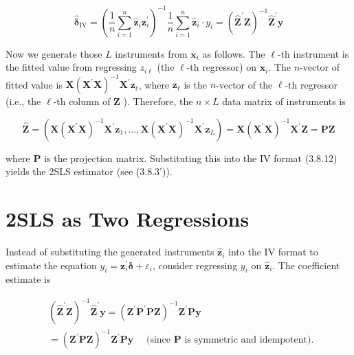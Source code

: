 \documentclass[10pt]{article}
\begin{document}
\begin{equation*}
\hat{\boldsymbol{\delta}}_{\mathrm{IV}}=\left(\frac{1}{n} \sum_{i=1}^{n} \hat{\mathbf{z}}_{i} \mathbf{z}_{i}^{\prime}\right)^{-1} \frac{1}{n} \sum_{i=1}^{n} \hat{\mathbf{z}}_{i} \cdot y_{i}=\left(\widehat{\mathbf{Z}}^{\prime} \mathbf{Z}\right)^{-1} \widehat{\mathbf{Z}}^{\prime} \mathbf{y} \tag{3.8.12}
\end{equation*}


Now we generate those $L$ instruments from $\mathbf{x}_{i}$ as follows. The $\ell$-th instrument is the fitted value from regressing $z_{i \ell}$ (the $\ell$-th regressor) on $\mathbf{x}_{i}$. The $n$-vector of fitted value is $\mathbf{X}\left(\mathbf{X}^{\prime} \mathbf{X}\right)^{-1} \mathbf{X}^{\prime} \mathbf{z}_{\ell}$, where $\mathbf{z}_{\ell}$ is the $n$-vector of the $\ell$-th regressor (i.e., the $\ell$-th column of $\mathbf{Z}$ ). Therefore, the $n \times L$ data matrix of instruments is


\begin{equation*}
\widehat{\mathbf{Z}}=\left(\mathbf{X}\left(\mathbf{X}^{\prime} \mathbf{X}\right)^{-1} \mathbf{X}^{\prime} \mathbf{z}_{1}, \ldots, \mathbf{X}\left(\mathbf{X}^{\prime} \mathbf{X}\right)^{-1} \mathbf{X}^{\prime} \mathbf{z}_{L}\right)=\mathbf{X}\left(\mathbf{X}^{\prime} \mathbf{X}\right)^{-1} \mathbf{X}^{\prime} \mathbf{Z}=\mathbf{P} \mathbf{Z} \tag{3.8.13}
\end{equation*}


where $\mathbf{P}$ is the projection matrix. Substituting this into the IV format (3.8.12) yields the 2SLS estimator (see (3.8.3')).

\section*{2SLS as Two Regressions}
Instead of substituting the generated instruments $\hat{\mathbf{z}}_{i}$ into the IV format to estimate the equation $y_{i}=\mathbf{z}_{i}^{\prime} \boldsymbol{\delta}+\varepsilon_{i}$, consider regressing $y_{i}$ on $\hat{\mathbf{z}}_{i}$. The coefficient estimate is

$$
\begin{aligned}
& \left(\widehat{\mathbf{Z}}^{\prime} \mathbf{Z}\right)^{-1} \widehat{\mathbf{Z}}^{\prime} \mathbf{y}=\left(\mathbf{Z}^{\prime} \mathbf{P}^{\prime} \mathbf{P} \mathbf{Z}\right)^{-1} \mathbf{Z}^{\prime} \mathbf{P} \mathbf{y} \\
& =\left(\mathbf{Z}^{\prime} \mathbf{P} \mathbf{Z}\right)^{-1} \mathbf{Z}^{\prime} \mathbf{P} \mathbf{y} \quad \text { (since } \mathbf{P} \text { is symmetric and idempotent). }
\end{aligned}
$$
\end{document}
